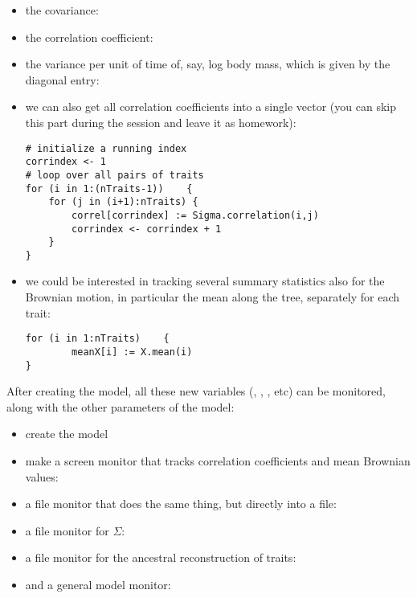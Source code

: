 \begin{itemize}
\item
the covariance:
\\
\item
the correlation coefficient:
\\
\item
the variance per unit of time of, say, log body mass, which is given by the diagonal entry:
\\
\item
we can also get all correlation coefficients into a single vector (you can skip this part during the session and leave it as  homework):
\begin{verbatim}
# initialize a running index
corrindex <- 1
# loop over all pairs of traits
for (i in 1:(nTraits-1))    {
    for (j in (i+1):nTraits) {
        correl[corrindex] := Sigma.correlation(i,j)
        corrindex <- corrindex + 1
    }
}
\end{verbatim}
\item
we could be interested in tracking several summary statistics also for the Brownian motion, in particular the mean along the tree, separately for each trait:
\begin{verbatim}
for (i in 1:nTraits)    {
        meanX[i] := X.mean(i)
}
\end{verbatim}
\end{itemize}
After creating the model, all these new variables (, , , etc) can be monitored, along with the other parameters of the model:
\begin{itemize}
\item
create the model
\\
\item
make a screen monitor that tracks correlation coefficients and mean Brownian values:
\\
\item
a file monitor that does the same thing, but directly into a file:
\\
\item
a file monitor for $\Sigma$:
\\
\item
a file monitor for the ancestral reconstruction of traits:
\\
\item
and a general model monitor:
\\
\end{itemize}
